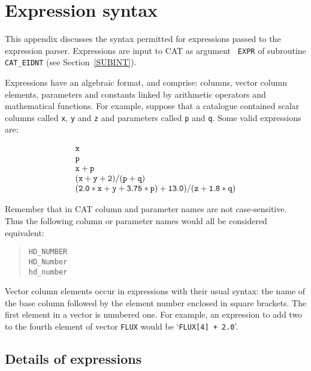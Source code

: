 \begin{small}
\end{small}

\newpage
\section{\label{EXPR}Expression syntax}

This appendix discusses the syntax permitted for expressions passed
to the expression parser. Expressions are input to CAT as argument {\tt
EXPR} of subroutine {\tt CAT\_EIDNT} (see Section~\ref{SUBINT}).

Expressions have an algebraic format, and comprise: columns, vector
column elements, parameters and constants linked by arithmetic
operators and mathematical functions. For example, suppose that a
catalogue contained scalar columns called {\tt x}, {\tt y} and {\tt z}
and parameters called {\tt p} and {\tt q}.  Some valid expressions are:

\begin{equation}
\begin{array}{l}
{\tt x}  \\
{\tt p}  \\
{\tt x + p}  \\
{\tt (x + y + 2) / (p + q)}  \\
{\tt (2.0*x + y + 3.75*p) + 13.0) / (z + 1.8*q)}
\end{array}
\end{equation}

Remember that in CAT column and parameter names are not case-sensitive.
Thus the following column or parameter names would all be considered
equivalent:

\begin{verse}
{\tt HD\_NUMBER} \\
{\tt HD\_Number} \\
{\tt hd\_number}
\end{verse}

Vector column elements occur in expressions with their usual syntax:
the name of the base column followed by the element number enclosed
in square brackets. The first element in a vector is numbered one. For
example, an expression to add two to the fourth element of vector
{\tt FLUX} would be `{\tt FLUX[4] + 2.0}'.


\subsection{Details of expressions}

